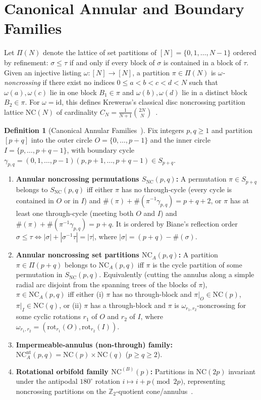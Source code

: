 \documentclass[11pt]{article}
\theoremstyle{definition}
\newtheorem{definition}[theorem]{Definition}
\newcommand{\NC}{\mathrm{NC}}
\newcommand{\NCA}{\mathrm{NC}_A}
\newcommand{\SNC}{S_{\mathrm{NC}}}
\newcommand{\NCB}{\mathrm{NC}^{(B)}}
\begin{document}
\section{Canonical Annular and Boundary Families}

Let $\Pi(N)$ denote the lattice of set partitions of $[N] = \{0, 1, \dots, N-1\}$ ordered by refinement: $\sigma \le \tau$ if and only if every block of $\sigma$ is contained in a block of $\tau$. Given an injective listing $\omega : [N] \to [N]$, a partition $\pi \in \Pi(N)$ is \emph{$\omega$-noncrossing} if there exist no indices $0 \le a < b < c < d < N$ such that $\omega(a), \omega(c)$ lie in one block $B_1 \in \pi$ and $\omega(b), \omega(d)$ lie in a distinct block $B_2 \in \pi$. For $\omega = \mathrm{id}$, this defines Kreweras's classical disc noncrossing partition lattice $\NC(N)$ of cardinality $C_N = \frac{1}{N+1}\binom{2N}{N}$~\cite{Kre72,NS06}.

\begin{definition}[Canonical Annular Families~\cite{MN04,BGN03}]\label{def:annular}
Fix integers $p, q \ge 1$ and partition $[p+q]$ into the outer circle $O = \{0, \dots, p-1\}$ and the inner circle $I = \{p, \dots, p+q-1\}$, with boundary cycle $\gamma_{p,q} = (0, 1, \dots, p-1)(p, p+1, \dots, p+q-1) \in S_{p+q}$.
\begin{enumerate}
  \item \textbf{Annular noncrossing permutations $\SNC(p,q)$:} A permutation $\pi \in S_{p+q}$ belongs to $\SNC(p,q)$ iff either $\pi$ has no through-cycle (every cycle is contained in $O$ or in $I$) and $\#(\pi) + \#(\pi^{-1}\gamma_{p,q}) = p + q + 2$, or $\pi$ has at least one through-cycle (meeting both $O$ and $I$) and $\#(\pi) + \#(\pi^{-1}\gamma_{p,q}) = p + q$. It is ordered by Biane's reflection order $\sigma \le \tau \iff |\sigma| + |\sigma^{-1}\tau| = |\tau|$, where $|\sigma| = (p+q) - \#(\sigma)$.
  \item \textbf{Annular noncrossing set partitions $\NCA(p,q)$:} A partition $\pi \in \Pi(p+q)$ belongs to $\NCA(p,q)$ iff $\pi$ is the cycle partition of some permutation in $\SNC(p,q)$. Equivalently (cutting the annulus along a simple radial arc disjoint from the spanning trees of the blocks of $\pi$), $\pi \in \NCA(p,q)$ iff either (i) $\pi$ has no through-block and $\pi|_O \in \NC(p)$, $\pi|_I \in \NC(q)$, or (ii) $\pi$ has a through-block and $\pi$ is $\omega_{r_1,r_2}$-noncrossing for some cyclic rotations $r_1$ of $O$ and $r_2$ of $I$, where $\omega_{r_1,r_2} = (\mathrm{rot}_{r_1}(O), \mathrm{rot}_{r_2}(I))$.
  \item \textbf{Impermeable-annulus (non-through) family:} $\NCA^{\mathrm{nt}}(p,q) = \NC(p) \times \NC(q)$ ($p \ge q \ge 2$).
  \item \textbf{Rotational orbifold family $\NCB(p)$:} Partitions in $\NC(2p)$ invariant under the antipodal $180^\circ$ rotation $i \mapsto i + p \pmod{2p}$, representing noncrossing partitions on the $\mathbb{Z}_2$-quotient cone/annulus~\cite{BGN03}.
\end{enumerate}
\end{definition}
\end{document}
